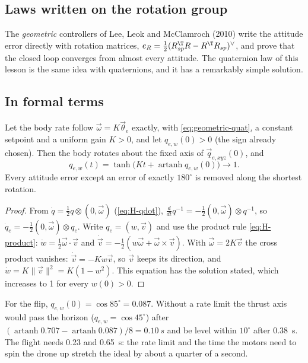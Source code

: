 \subsection{Laws written on the rotation group}
The \emph{geometric} controllers of Lee, Leok and McClamroch (2010) write the attitude error directly with rotation matrices, $e_R = \tfrac12(R_{sp}^\T R - R^\T R_{sp})^\vee$, and prove that the closed loop converges from almost every attitude. The quaternion law of this lesson is the same idea with quaternions, and it has a remarkably simple solution.

\subsection{In formal terms}

\begin{theorem}
\label{thm:geometric-tanh}
Let the body rate follow $\vec\omega = K\vec\theta_e$ exactly, with \cref{eq:geometric-quat}, a constant setpoint and a uniform gain $K > 0$, and let $q_{e,w}(0) > 0$ (the sign already chosen). Then the body rotates about the fixed axis of $\vec q_{e,xyz}(0)$, and
\begin{equation*}
  q_{e,w}(t) = \tanh\big(Kt + \operatorname{artanh} q_{e,w}(0)\big) \to 1 .
\end{equation*}
Every attitude error except an error of exactly $180^\circ$ is removed along the shortest rotation.
\end{theorem}
\begin{proof}
From $\dot q = \tfrac12 q \otimes (0, \vec\omega)$ (\cref{eq:H-qdot}), $\frac{d}{dt}q^{-1} = -\tfrac12(0, \vec\omega) \otimes q^{-1}$, so $\dot q_e = -\tfrac12(0, \vec\omega) \otimes q_e$. Write $q_e = (w, \vec v)$ and use the product rule \cref{eq:H-product}: $\dot w = \tfrac12\vec\omega\cdot\vec v$ and $\dot{\vec v} = -\tfrac12(w\vec\omega + \vec\omega\times\vec v)$. With $\vec\omega = 2K\vec v$ the cross product vanishes: $\dot{\vec v} = -Kw\vec v$, so $\vec v$ keeps its direction, and $\dot w = K\|\vec v\|^2 = K(1 - w^2)$. This equation has the solution stated, which increases to 1 for every $w(0) > 0$.
\end{proof}

For the flip, $q_{e,w}(0) = \cos 85^\circ = 0.087$. Without a rate limit the thrust axis would pass the horizon ($q_{e,w} = \cos45^\circ$) after $(\operatorname{artanh}0.707 - \operatorname{artanh}0.087)/8 = \SI{0.10}{s}$ and be level within $10^\circ$ after \SI{0.38}{s}. The flight needs 0.23 and \SI{0.65}{s}: the rate limit and the time the motors need to spin the drone up stretch the ideal by about a quarter of a second.

